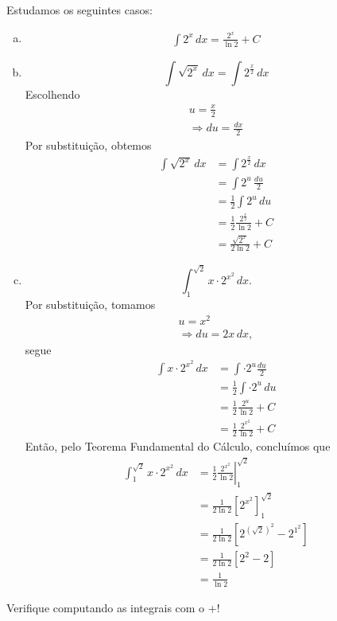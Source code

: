 \begin{ex}
  Estudamos os seguintes casos:
  \begin{enumerate}[a)]
  \item
    \begin{align}
      \int 2^x\,dx = \frac{2^x}{\ln 2} + C
    \end{align}
  \item
    \begin{equation}
      \int \sqrt{2^x}\,dx = \int 2^{\frac{x}{2}}\,dx
    \end{equation}
    Escolhendo
    \begin{gather}
      u = \frac{x}{2}\\
      \Rightarrow du = \frac{dx}{2}
    \end{gather}
    Por substituição, obtemos
    \begin{align}
      \int \sqrt{2^x}\,dx &= \int 2^{\frac{x}{2}}\,dx\\
                          &= \int 2^u\,\frac{du}{2}\\
                          &= \frac{1}{2}\int 2^u\,du\\
                          &= \frac{1}{2}\frac{2^{\frac{x}{2}}}{\ln 2} + C\\
                          &= \frac{\sqrt{2^x}}{2\ln 2} + C
    \end{align}
  \item
    \begin{equation}
      \int_1^{\sqrt{2}} x\cdot 2^{x^2}\,dx.
    \end{equation}
    Por substituição, tomamos
    \begin{gather}
      u = x^2\\
      \Rightarrow du = 2x\,dx,
    \end{gather}
    segue
    \begin{align}
      \int x\cdot 2^{x^2}\,dx &= \int \cdot 2^{u}\frac{du}{2} \\
                              &= \frac{1}{2}\int \cdot 2^{u}\,du \\
                              &= \frac{1}{2}\frac{2^u}{\ln 2} + C \\
                              &= \frac{1}{2}\frac{2^{x^2}}{\ln 2} + C
    \end{align}
    Então, pelo Teorema Fundamental do Cálculo, concluímos que
    \begin{align}
      \int_1^{\sqrt{2}} x\cdot 2^{x^2}\,dx &= \left.\frac{1}{2}\frac{2^{x^2}}{\ln 2}\right|_1^{\sqrt{2}}\\
                                           &= \frac{1}{2\ln 2}\left[2^{x^2}\right]_1^{\sqrt{2}}\\
                                           &= \frac{1}{2\ln 2}\left[2^{(\sqrt{2})^2}-2^{1^2}\right]\\
                                           &= \frac{1}{2\ln 2}\left[2^{2}-2\right]\\
                                           &= \frac{1}{\ln 2}
    \end{align}
  \end{enumerate}
  \ifispython
  Verifique computando as integrais com o {\python}+{\sympy}!
  \fi
\end{ex}

